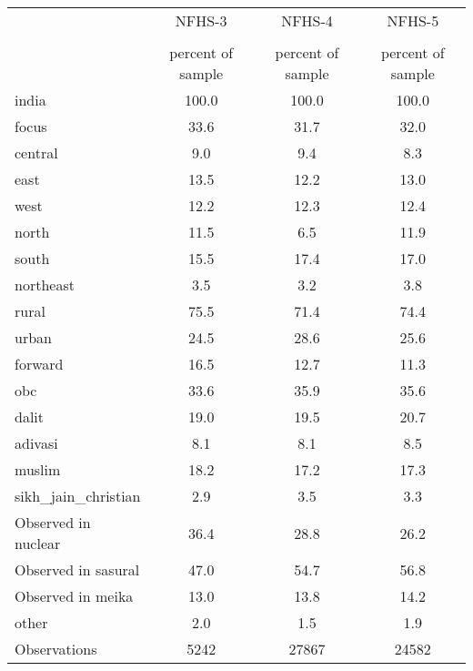 {
\def\sym#1{\ifmmode^{#1}\else\(^{#1}\)\fi}
\begin{tabular}{l*{3}{c}}
\toprule
                    &      NFHS-3&      NFHS-4&      NFHS-5\\
                    &\multicolumn{1}{c}{}&\multicolumn{1}{c}{}&\multicolumn{1}{c}{}\\
                    &percent of sample&percent of sample&percent of sample\\
\midrule
india               &       100.0&       100.0&       100.0\\
focus               &        33.6&        31.7&        32.0\\
central             &         9.0&         9.4&         8.3\\
east                &        13.5&        12.2&        13.0\\
west                &        12.2&        12.3&        12.4\\
north               &        11.5&         6.5&        11.9\\
south               &        15.5&        17.4&        17.0\\
northeast           &         3.5&         3.2&         3.8\\
rural               &        75.5&        71.4&        74.4\\
urban               &        24.5&        28.6&        25.6\\
forward             &        16.5&        12.7&        11.3\\
obc                 &        33.6&        35.9&        35.6\\
dalit               &        19.0&        19.5&        20.7\\
adivasi             &         8.1&         8.1&         8.5\\
muslim              &        18.2&        17.2&        17.3\\
sikh\_jain\_christian &         2.9&         3.5&         3.3\\
Observed in nuclear &        36.4&        28.8&        26.2\\
Observed in sasural &        47.0&        54.7&        56.8\\
Observed in meika   &        13.0&        13.8&        14.2\\
other               &         2.0&         1.5&         1.9\\
\midrule
Observations        &        5242&       27867&       24582\\
\bottomrule
\end{tabular}
}
